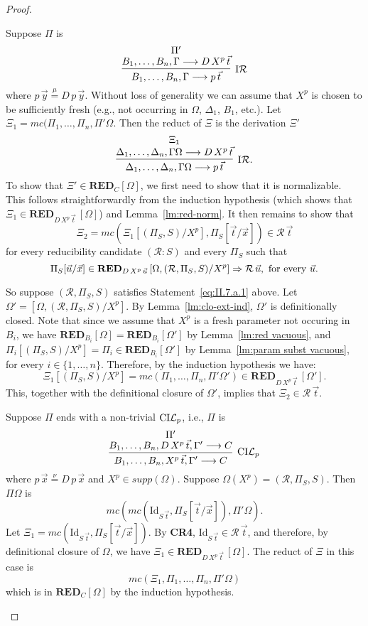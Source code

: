 \documentclass[preprint]{elsarticle}
\def\Rscr{{\mathcal R}}
\newcommand{\Seq}[2]{#1\longrightarrow #2}
\newcommand{\defmu}{\stackrel{\mu}{=}}
\newcommand{\defnu}{\stackrel{\nu}{=}}
\newcommand{\indR}{{\rm I}{\cal R}}
\newcommand{\coindLP}{{\rm CI}{\cal L}_p}
\def\RED{{\mathbf{RED}}}
\def\idrv{{\mathrm{Id}}}
\begin{document}
\begin{proof}
\begin{trivlist}
\item[\fbox{$-/\indR$}] Suppose $\Pi$ is
$$
\infer[\indR] {\Seq{B_1,\ldots,B_n,\Gamma}{p\,\vec t}} {
  \deduce{\Seq{B_1,\ldots,B_n,\Gamma}{D\,X^p\,\vec t}}{\Pi'} }
$$
where $p\,\vec y \defmu D\,p\,\vec y$.  Without loss of generality we
can assume that $X^p$ is chosen to be sufficiently fresh (e.g., not
occurring in $\Omega$, $\Delta_1$, $B_1$, etc.).  
Let $\Xi_1 = mc(\Pi_1,\ldots,\Pi_n,\Pi'\Omega$. 
Then the reduct of $\Xi$ is the derivation $\Xi'$
$$
\infer[\indR .]  {\Seq{\Delta_1,\ldots,\Delta_n,\Gamma\Omega}{p\,\vec
    t}} {
  \deduce{\Seq{\Delta_1,\ldots,\Delta_n,\Gamma\Omega}{D\,X^p\,\vec
      t}}{\Xi_1} }
$$
To show that $\Xi' \in \RED_C[\Omega]$, we first need to show that it
is normalizable.  This follows straightforwardly from the induction
hypothesis (which shows that $\Xi_1 \in \RED_{D\,X^p\,\vec
  t}\, [\Omega]$) and Lemma~\ref{lm:red-norm}.  It then remains to show
that
$$
\Xi_2 = mc(\Xi_1[(\Pi_S,S)/X^p], \Pi_S[\vec t/\vec x]) \in \Rscr\,\vec
t
$$
for every reducibility candidate $(\Rscr : S)$ and every $\Pi_S$ such
that
\begin{equation}
  \label{eq:II.7.a.1}
  \Pi_S[\vec u/\vec x] \in \RED_{D\,X^p\,\vec u}\, [\Omega, (\Rscr,\Pi_S,S)/X^p] \Rightarrow \Rscr\,\vec u,
  \hbox{ for every $\vec u$.}
\end{equation}

So suppose $(\Rscr,\Pi_S,S)$ satisfies Statement~\ref{eq:II.7.a.1}
above.  Let $\Omega' = [\Omega, (\Rscr,\Pi_S,S)/X^p]$. 
By Lemma~\ref{lm:clo-ext-ind}, $\Omega'$ is definitionally closed.  Note
that since we assume that $X^p$ is a fresh parameter not occuring in
$B_i$, we have
$\RED_{B_i}[\Omega] = \RED_{B_i}[\Omega']$ 
by Lemma~\ref{lm:red vacuous}, and
$
\Pi_i[(\Pi_S,S)/X^p] = \Pi_i \in \RED_{B_i}[\Omega']
$
by Lemma~\ref{lm:param subst vacuous}, for every $i \in
\{1,\ldots,n\}$.  Therefore, by the induction hypothesis we have:
$$
\Xi_1[(\Pi_S,S)/X^p] = mc(\Pi_1,\ldots,\Pi_n,\Pi'\Omega') \in
\RED_{D\,X^p\,\vec t}\, [\Omega'].
$$
This, together with the definitional closure of $\Omega'$, implies that
$
\Xi_2 \in \Rscr\,\vec t.
$

\item[\fbox{$-/\coindLP$}] Suppose $\Pi$ ends with a non-trivial $\coindLP$,
  i.e., $\Pi$ is
$$
\infer[\coindLP] {\Seq{B_1,\ldots,B_n, X^p\,\vec t, \Gamma'}{C}} {
  \deduce{\Seq{B_1,\ldots,B_n, D\,X^p\,\vec t, \Gamma'}{C}}{\Pi'} }
$$
where $p\,\vec x \defnu D\,p\,\vec x$ and $X^p \in supp(\Omega)$.
Suppose $\Omega(X^p) = (\Rscr, \Pi_S,S)$.  Then $\Pi\Omega$ is
$$
mc(mc(\idrv_{S\,\vec t}, \Pi_S[\vec t/\vec x]),\Pi'\Omega).
$$
Let $\Xi_1 = mc(\idrv_{S\,\vec t}, \Pi_S[\vec t/\vec x])$.  By {\bf
  CR4}, $\idrv_{S\,\vec t} \in \Rscr \,\vec t$, and therefore, by
definitional closure of $\Omega$, we have $\Xi_1 \in
\RED_{D\,X^p\,\vec t}\, [\Omega]$.  The reduct of $\Xi$ in this case is
$$
mc(\Xi_1,\Pi_1,\ldots,\Pi_n,\Pi'\Omega)
$$
which is in $\RED_C[\Omega]$ by the induction hypothesis.


\end{trivlist}
\end{proof}
\end{document}
